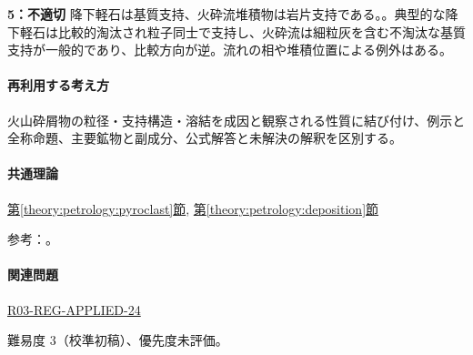 \noindent\textbf{5：不適切} 降下軽石は基質支持、火砕流堆積物は岩片支持である。。典型的な降下軽石は比較的淘汰され粒子同士で支持し、火砕流は細粒灰を含む不淘汰な基質支持が一般的であり、比較方向が逆。流れの相や堆積位置による例外はある。\par

\paragraph{再利用する考え方} 火山砕屑物の粒径・支持構造・溶結を成因と観察される性質に結び付け、例示と全称命題、主要鉱物と副成分、公式解答と未解決の解釈を区別する。

\paragraph{共通理論} \hyperref[theory:petrology:pyroclast]{第\ref*{theory:petrology:pyroclast}節}, \hyperref[theory:petrology:deposition]{第\ref*{theory:petrology:deposition}節}

\par 参考：\cite{usgs_tephra_sizes,usgs_pinatubo1996,usgs_ash_density,usgs_bishop_tuff}。

\paragraph{関連問題} \hyperref[q:r03-reg-applied-24]{R03-REG-APPLIED-24}

\par 難易度 3（校準初稿）、優先度未評価。
